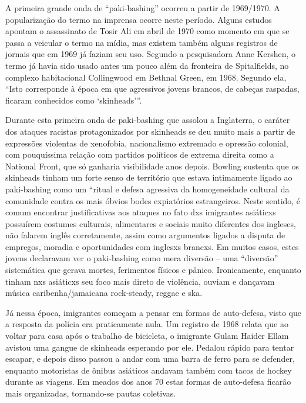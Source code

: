 A primeira grande onda de “paki-bashing” ocorreu a partir de 1969/1970. A popularização do termo na imprensa ocorre neste período. Alguns estudos apontam o assassinato de Tosir Ali em abril de 1970 como momento em que se passa a veicular o termo na mídia, mas existem também alguns registros de jornais que em 1969 já faziam seu uso. Segundo a pesquisadora Anne Kershen, o termo já havia sido usado antes um pouco além da fronteira de Spitalfields, no complexo habitacional Collingwood em Bethnal Green, em 1968. Segundo ela, “Isto corresponde à época em que agressivos jovens brancos, de cabeças raspadas, ficaram conhecidos como ‘skinheads’”.

Durante esta primeira onda de paki-bashing que assolou a Inglaterra, o caráter dos ataques racistas protagonizados por skinheads se deu muito mais a partir de expressões violentas de xenofobia, nacionalismo extremado e opressão colonial, com pouquíssima relação com partidos políticos de extrema direita como a National Front, que só ganharia visibilidade anos depois. Bowling sustenta que os skinheads tinham um forte senso de território que estava intimamente ligado ao paki-bashing como um “ritual e defesa agressiva da homogeneidade cultural da comunidade contra os mais óbvios bodes expiatórios estrangeiros. Neste sentido, é comum encontrar justificativas aos ataques no fato dxs imigrantes asiáticxs possuírem costumes culturais, alimentares e sociais muito diferentes dos ingleses, não falarem inglês corretamente, assim como argumentos ligados a disputa de empregos, moradia e oportunidades com inglesxs brancxs. Em muitos casos, estes jovens declaravam ver o paki-bashing como mera diversão – uma “diversão” sistemática que gerava mortes, ferimentos físicos e pânico. Ironicamente, enquanto tinham nxs asiáticxs seu foco mais direto de violência, ouviam e dançavam música caribenha/jamaicana rock-steady, reggae e ska.

Já nessa época, imigrantes começam a pensar em formas de auto-defesa, visto que a resposta da polícia era praticamente nula. Um registro de 1968 relata que ao voltar para casa após o trabalho de bicicleta, o imigrante Gulam Haider Ellam avistou uma gangue de skinheads esperando por ele. Pedalou rápido para tentar escapar, e depois disso passou a andar com uma barra de ferro para se defender, enquanto motoristas de ônibus asiáticos andavam também com tacos de hockey durante as viagens. Em meados dos anos 70 estas formas de auto-defesa ficarão mais organizadas, tornando-se pautas coletivas.

